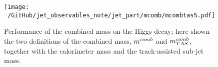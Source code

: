 \begin{figure}[!ht]
  \centering
      \texttt{[image: ~/GitHub/jet\_observables\_note/jet\_part/mcomb/mcombtas5.pdf]}
  \caption[$\mcombtas$ on the boosted Higgs]{Performance of the combined mass on the Higgs decay; here shown the two definitions of the combined mass, $m^{comb}$ and $\mcombtas$, together with the calorimeter mass and the track-assisted sub-jet mass.}
  \label{fig:mcombtas5}
\end{figure}

